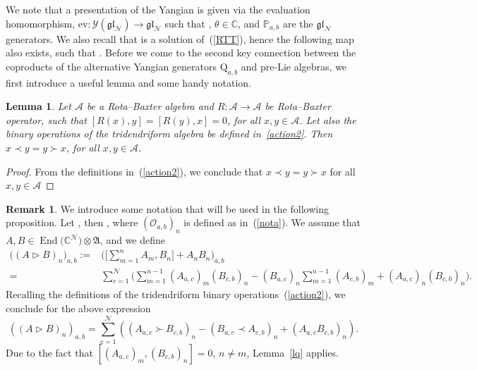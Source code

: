 \documentclass[pdftex]{sigma}
\numberwithin{equation}{section}
\newtheorem{lem}[thm]{Lemma}
\theoremstyle{definition}
\newtheorem{rem}[thm]{Remark}
\DeclareMathOperator{\EEnd}{End}%
\begin{document}
We note that a presentation of the Yangian is given via the evaluation homomorphism, $\mbox{ev}\colon {\mathcal Y}(\mathfrak{gl}_{\mathcal N}) \to \mathfrak{gl}_{\mathcal N}$ such that , $\theta \in {\mathbb C}$, and
${\mathbb P}_{a,b}$ are the $\mathfrak{gl}_{\mathcal N}$ generators.
We also recall that  is a solution of~(\ref{RTT}), hence the following map also exists,  such that . Before we come to the second key connection between the coproducts of the alternative Yangian generators ${\mathrm Q}_{a, b}$ and pre-Lie algebras, we first introduce a useful lemma and some handy notation.

\begin{lem}{\label{lq}}
Let $\mathcal{A}$ be a Rota--Baxter algebra and $R\colon \mathcal{A} \to \mathcal{A}$ be Rota--Baxter operator, such that $[R(x), y] = [R(y), x] =0$, for all $x, y \in \mathcal{A}$. Let also the binary operations of the tridendriform algebra be defined in~\eqref{action2}. Then $x\prec y = y\succ x$, for all $x, y \in \mathcal{A}$.
\end{lem}
\begin{proof} From the definitions in~(\ref{action2}), we conclude that $x\prec y = y\succ x$ for all $x,y \in \mathcal{A}$
\end{proof}

\begin{rem}\label{nota2} We introduce some notation that will be used in the following proposition. Let \smash{${\mathcal O} \in \EEnd\bigl({\mathbb C}^{\mathcal N} \bigr) \otimes {\mathfrak A}$}, then , where $({\mathcal O}_{a,b})_n $ is defined as in~(\ref{nota}). We assume that $A, B \in \EEnd\bigl({\mathbb C}^{\mathcal N} \bigr) \otimes {\mathfrak A}$, and we define
\begin{align*}
\bigl((A \triangleright B)_n\bigr)_{a,b} :={}& \Biggl(\Biggl[ \sum _{m=1}^n A_m, B_n \Biggr] + A_n B_n\Biggr)_{a,b} \\
={}& \sum_{c =1}^{\mathcal N} \Biggl( \sum_{m=1}^{n-1} (A_{a,c})_m (B_{c,b})_n- (B_{a,c})_n\sum_{m=1}^{n-1} (A_{c,b})_m + (A_{a,c})_n (B_{c,b})_n \Biggr). \nonumber
\end{align*}
Recalling the definitions of the tridendriform binary operations~(\ref{action2}), we conclude for the above expression
\begin{equation*}
((A \triangleright B)_n)_{a,b} = \sum_{c =1}^{\mathcal N} ( (A_{a,c} \succ B_{c,b})_n- (B_{a,c} \prec A_{c,b})_n + (A_{a,c} B_{c,b})_n).
\end{equation*}
Due to the fact that $[(A_{a,c})_m, (B_{c,b})_n] =0$, $n\neq m$, Lemma~\ref{lq} applies.
\end{rem}
\end{document}
